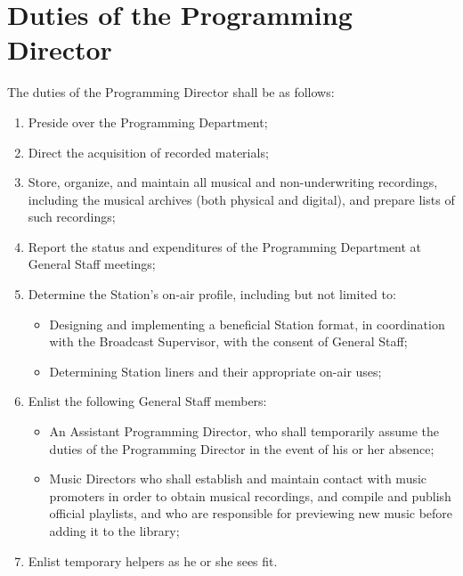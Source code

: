 \documentclass[12pt]{constitution}
\begin{document}
\section{​Duties of the Programming Director}
The duties of the Programming Director shall be as follows:
\begin{enumerate}
\item Preside over the Programming Department;
\item Direct the acquisition of recorded materials;
\item Store, organize, and maintain all musical and non-underwriting recordings, including the musical archives (both physical and digital), and prepare lists of such recordings;
\item Report the status and expenditures of the Programming Department at General Staff meetings;
\item Determine the Station's on-­air profile, including but not limited to:
\begin{itemize}
\item Designing and implementing a beneficial Station format, in coordination with the Broadcast Supervisor, with the consent of General Staff;
\item Determining Station liners and their appropriate on-­air uses;
\end{itemize}
\item Enlist the following General Staff members:
\begin{itemize}
\item An Assistant Programming Director, who shall temporarily assume the duties of the Programming Director in the event of his or her absence;
\item Music Directors who shall establish and maintain contact with music promoters in order to obtain musical recordings, and compile and publish official playlists, and who are responsible for previewing new music before adding it to the library;
\end{itemize}
\item Enlist temporary helpers as he or she sees fit.
\end{enumerate}
\end{document}

